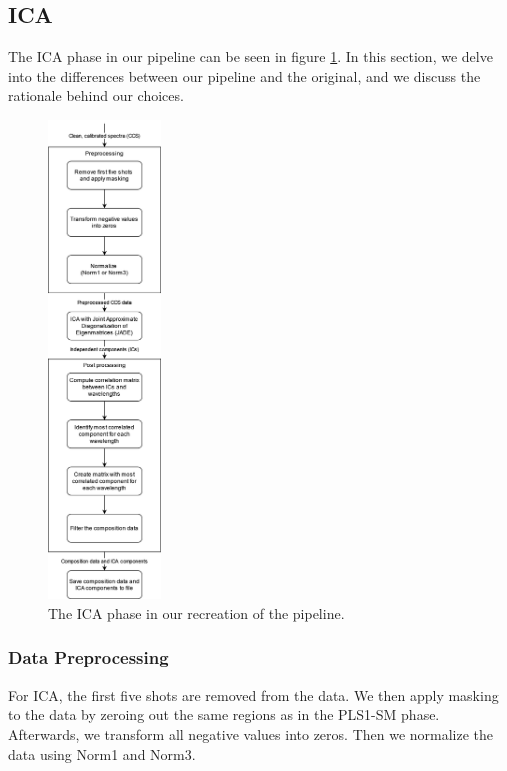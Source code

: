 \subsection{ICA}\label{sec:methodology_ica}
The ICA phase in our pipeline can be seen in figure \ref{fig:ica_phase}.
In this section, we delve into the differences between our pipeline and the original, and we discuss the rationale behind our choices.

\begin{figure}
	\centering
	\includegraphics[width=0.2675\textwidth]{images/ica_phase.png}
	\caption{The ICA phase in our recreation of the pipeline.}
	\label{fig:ica_phase}
\end{figure}

\subsubsection{Data Preprocessing}\label{sec:ica_data_preprocessing}
For ICA, the first five shots are removed from the data.
We then apply masking to the data by zeroing out the same regions as in the PLS1-SM phase.
Afterwards, we transform all negative values into zeros.
Then we normalize the data using Norm1 and Norm3.

